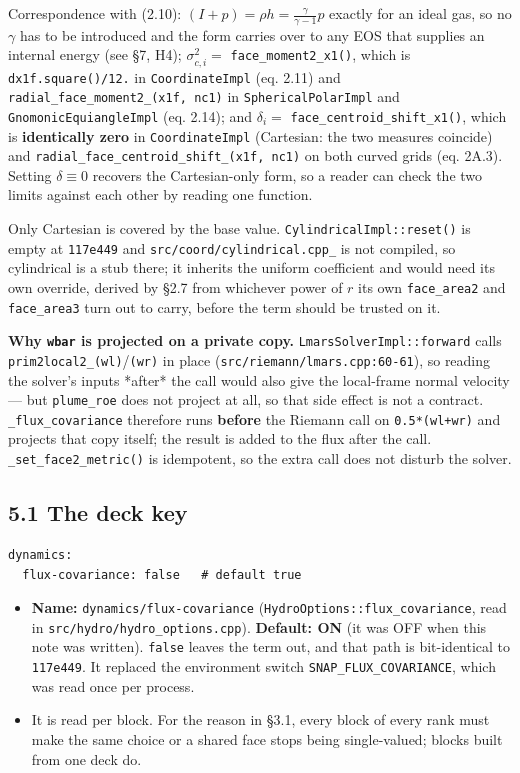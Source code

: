 \documentclass[11pt,a4paper]{article}
\begin{document}
Correspondence with (2.10): $(I+p)=\rho h=\frac{\gamma}{\gamma-1}p$ exactly for an
ideal gas, so no $\gamma$ has to be introduced and the form carries over to any
EOS that supplies an internal energy (see §7, H4);
$\sigma^2_{c,i}=$ \texttt{face\_moment2\_x1()}, which is \texttt{dx1f.square()/12.} in
\texttt{CoordinateImpl} (eq. 2.11) and \texttt{radial\_face\_moment2\_(x1f, nc1)} in
\texttt{SphericalPolarImpl} and \texttt{GnomonicEquiangleImpl} (eq. 2.14); and
$\delta_i=$ \texttt{face\_centroid\_shift\_x1()}, which is \textbf{identically zero} in
\texttt{CoordinateImpl} (Cartesian: the two measures coincide) and
\texttt{radial\_face\_centroid\_shift\_(x1f, nc1)} on both curved grids (eq. 2A.3). Setting
$\delta\equiv0$ recovers the Cartesian-only form, so a reader can check the two
limits against each other by reading one function.

Only Cartesian is covered by the base value. \texttt{CylindricalImpl::reset()} is empty
at \texttt{117e449} and \texttt{src/coord/cylindrical.cpp\_} is not compiled, so cylindrical is
a stub there; it inherits the uniform coefficient and would need its own
override, derived by §2.7 from whichever power of $r$ its own \texttt{face\_area2} and
\texttt{face\_area3} turn out to carry, before the term should be trusted on it.

\textbf{Why \texttt{wbar} is projected on a private copy.} \texttt{LmarsSolverImpl::forward} calls
\texttt{prim2local2\_(wl)}/\texttt{(wr)} in place (\texttt{src/riemann/lmars.cpp:60-61}), so reading
the solver's inputs *after* the call would also give the local-frame normal
velocity — but \texttt{plume\_roe} does not project at all, so that side effect
is not a contract. \texttt{\_flux\_covariance} therefore runs \textbf{before} the Riemann call
on \texttt{0.5*(wl+wr)} and projects that copy itself; the result is added to the flux
after the call. \texttt{\_set\_face2\_metric()} is idempotent, so the extra call does not
disturb the solver.

\subsection*{5.1 The deck key}

\begin{lstlisting}
dynamics:
  flux-covariance: false   # default true
\end{lstlisting}

\begin{itemize}
\item \textbf{Name:} \texttt{dynamics/flux-covariance} (\texttt{HydroOptions::flux\_covariance}, read
  in \texttt{src/hydro/hydro\_options.cpp}). \textbf{Default: ON} (it was OFF when this note
  was written). \texttt{false} leaves the term out, and that path is bit-identical to
  \texttt{117e449}. It replaced the environment switch \texttt{SNAP\_FLUX\_COVARIANCE}, which
  was read once per process.
\item It is read per block. For the reason in §3.1, every block of every rank must
  make the same choice or a shared face stops being single-valued; blocks built
  from one deck do.
\end{itemize}
\end{document}

